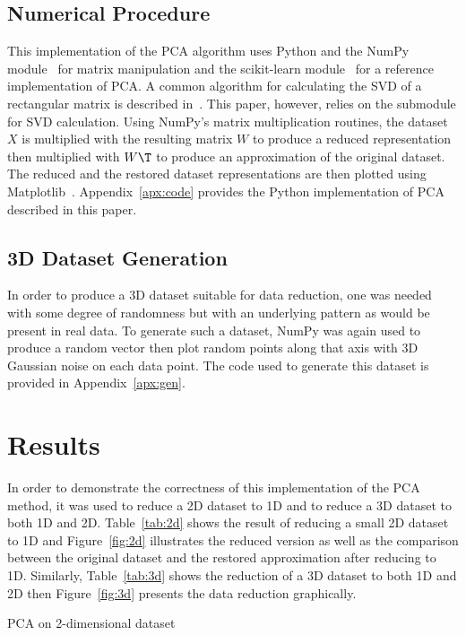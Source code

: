 \documentclass{article}
\begin{document}
	\subsection{Numerical Procedure}
		This implementation of the PCA algorithm uses Python and the NumPy module~\cite{numpy} for matrix manipulation and the scikit-learn module~\cite{sklearn} for a reference implementation of PCA. A common algorithm for calculating the SVD of a rectangular matrix is described in~\cite{svd}. This paper, however, relies on the submodule \hbox{} for SVD calculation. Using NumPy's matrix multiplication routines, the dataset $X$ is multiplied with the resulting matrix $W$ to produce a reduced representation then multiplied with $W\T$ to produce an approximation of the original dataset. The reduced and the restored dataset representations are then plotted using Matplotlib~\cite{matplotlib}. Appendix~\ref{apx:code} provides the Python implementation of PCA described in this paper.

	\subsection{3D Dataset Generation}
		In order to produce a 3D dataset suitable for data reduction, one was needed with some degree of randomness but with an underlying pattern as would be present in real data. To generate such a dataset, NumPy was again used to produce a random vector then plot random points along that axis with 3D Gaussian noise on each data point. The code used to generate this dataset is provided in Appendix~\ref{apx:gen}.

	\section{Results}
		In order to demonstrate the correctness of this implementation of the PCA method, it was used to reduce a 2D dataset to 1D and to reduce a 3D dataset to both 1D and 2D. Table~\ref{tab:2d} shows the result of reducing a small 2D dataset to 1D and Figure~\ref{fig:2d} illustrates the reduced version as well as the comparison between the original dataset and the restored approximation after reducing to 1D. Similarly, Table~\ref{tab:3d} shows the reduction of a 3D dataset to both 1D and 2D then Figure~\ref{fig:3d} presents the data reduction graphically.

		\begin{table}[!htbp]
			\centering
			\caption{PCA on 2-dimensional dataset\vspace{-3ex}}\vspace{2ex}
			\label{tab:2d}
		\end{table}
\end{document}
